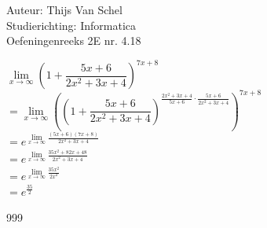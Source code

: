 \documentclass[a4paper]{article}
\begin{document}
  
\noindent \large Auteur: Thijs Van Schel\\
\noindent \large Studierichting: Informatica\\
\noindent \large Oefeningenreeks 2E nr. 4.18\\

\medskip
\normalsize

$\lim\limits_{x \to \infty} \left( 1 + \dfrac{5x+6}{2x^2+3x+4} \right)^{7x+8}$  \\

$= \lim\limits_{x \to \infty} \left( \left( 1 + \dfrac{5x+6}{2x^2+3x+4} \right)^{\tfrac{2x^2+3x+4}{5x+6} \cdot \tfrac{5x+6}{2x^2+3x+4}} \right)^{7x+8}$  \\

$= e^{\lim\limits_{x \to \infty} \tfrac{(5x+6)(7x+8)}{2x^2+3x+4}}$  \\

$= e^{\lim\limits_{x \to \infty} \tfrac{35x^2 + 82x + 48}{2x^2+3x+4}}$  \\

$= e^{\lim\limits_{x \to \infty} \tfrac{35x^2}{2x^2}}$  \\

$= e^{\tfrac{35}{2}}$  \\

\begin{thebibliography}{999}
\end{thebibliography}
\end{document}
